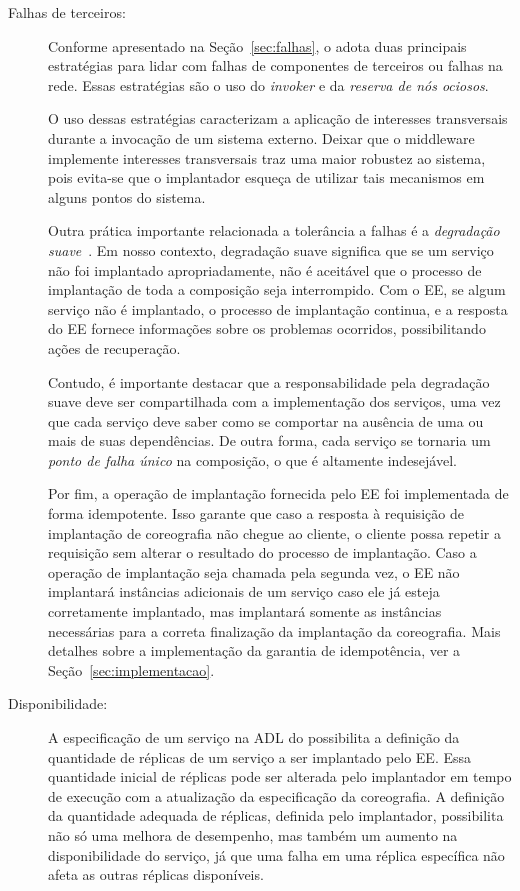 \begin{description}
\item [Falhas de terceiros:]

Conforme apresentado na Seção~\ref{sec:falhas},
o \ee adota duas principais estratégias para lidar com falhas
de componentes de terceiros ou falhas na rede.
Essas estratégias são o uso do \emph{invoker} e da
\emph{reserva de nós ociosos}.

O uso dessas estratégias caracterizam a aplicação de interesses transversais
durante a invocação de um sistema externo.
Deixar que o middleware implemente interesses transversais
traz uma maior robustez ao sistema, pois evita-se que o implantador
esqueça de utilizar tais mecanismos em alguns pontos do sistema.

Outra prática importante relacionada a tolerância a falhas é a 
\emph{degradação suave}~\cite{Brewer2001GiantScale,Hamilton2007InternetScale}.
Em nosso contexto, degradação suave significa que se um serviço não foi 
implantado apropriadamente, não é aceitável que o processo de implantação
de toda a composição seja interrompido.
Com o EE, se algum serviço não é implantado, o processo de implantação continua,
e a resposta do EE fornece informações sobre os problemas ocorridos,
possibilitando ações de recuperação.

Contudo, é importante destacar que a responsabilidade pela degradação suave
deve ser compartilhada com a implementação dos serviços, uma vez que cada serviço
deve saber como se comportar na ausência de uma ou mais de suas dependências.
De outra forma, cada serviço se tornaria um \emph{ponto de falha único} na composição,
o que é altamente indesejável.

Por fim, a operação de implantação fornecida pelo EE foi implementada de forma idempotente. 
Isso garante que caso a resposta à requisição 
de implantação de coreografia não chegue ao cliente, o cliente possa repetir a requisição
sem alterar o resultado do processo de implantação. 
Caso a operação de implantação seja chamada pela segunda vez, o EE não implantará
instâncias adicionais de um serviço caso ele já esteja corretamente implantado, mas 
implantará somente as instâncias necessárias para a correta finalização da implantação 
da coreografia. Mais detalhes sobre a implementação da garantia de idempotência, ver a Seção~\ref{sec:implementacao}.

\item [Disponibilidade:]

A especificação de um serviço na ADL do \ee possibilita a definição da quantidade de réplicas
de um serviço a ser implantado pelo EE.
Essa quantidade inicial de réplicas pode ser alterada pelo implantador em tempo de execução
com a atualização da especificação da coreografia.
A definição da quantidade adequada de réplicas, definida pelo implantador, possibilita não só uma melhora
de desempenho, mas também um aumento na disponibilidade do serviço, já que uma falha em uma réplica
específica não afeta as outras réplicas disponíveis.


\end{description}
